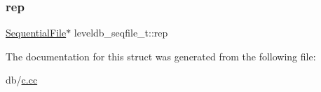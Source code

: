\subsubsection{\texorpdfstring{rep}{rep}}
{\footnotesize\ttfamily \mbox{\hyperlink{classleveldb_1_1_sequential_file}{Sequential\+File}}$\ast$ leveldb\+\_\+seqfile\+\_\+t\+::rep}



The documentation for this struct was generated from the following file\+:\begin{DoxyCompactItemize}
\item 
db/\mbox{\hyperlink{c_8cc}{c.\+cc}}\end{DoxyCompactItemize}
